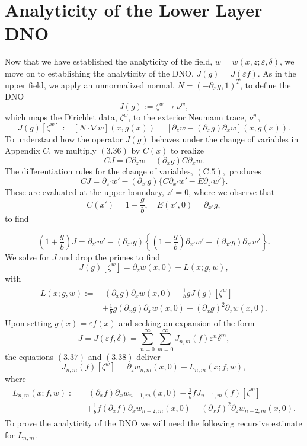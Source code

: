 \section{Analyticity of the Lower Layer DNO}
\label{intro:analyticity of lower dno}

Now that we have established the analyticity of the field, $w=w(x,z;\varepsilon,\delta)$, we move on to establishing the analyticity of the DNO, $J(g)=J(\varepsilon f)$. As in the upper field, we apply an unnormalized normal, $N=(-\partial_x g,1)^T$, to define the DNO
\begin{equation} J(g):= \zeta^w \to \nu^w,\end{equation}
which maps the Dirichlet data, $\zeta^w$, to the exterior Neumann trace, $\nu^w$,
\begin{equation}J(g)[\zeta^w]:= [N\cdot \nabla w](x,g(x)) = [\partial_z w - (\partial_x g) \partial_x w](x,g(x)).\end{equation}
To understand how the operator $J(g)$ behaves under the change of variables in Appendix $C$, we multiply $(3.36)$ by $C(x)$ to realize
$$CJ = C\partial_z w - (\partial_x g) C\partial_x w.$$
The differentiation rules for the change of variables, $(\text{C}.5),$ produces
$$CJ = \partial_{z'}w'-(\partial_{x'} g)\{C\partial_{x'} w' - E\partial_{z'} w'\}.$$
These are evaluated at the upper boundary, $z'=0$, where we observe that
$$C(x')=1+\frac{g}{b},\quad E(x',0)=\partial_{x'}g,$$
to find

$$\left(1+\frac{g}{b}\right)J=\partial_{z'}w' -(\partial_{x'} g)\left\{\left(1+\frac{g}{b}\right)\partial_{x'} w' - (\partial_{x'}g)\partial_{z'} w' \right\}.$$
We solve for $J$ and drop the primes to find
\begin{equation}J(g)[\zeta^w] = \partial_z w(x,0) - L(x;g,w),\end{equation}
with
\begin{align}
\begin{split}
L(x;g,w):= &~(\partial_xg)\partial_x w(x,0)-\frac{1}{b}gJ(g)[\zeta^w]\\&  + \frac{1}{b}g(\partial_x g)\partial_x w(x,0)  -(\partial_x g)^2\partial_z w(x,0). 
\end{split}
\end{align}
Upon setting $g(x)=\varepsilon f(x)$ and seeking an expansion of the form
$$J=J(\varepsilon f,\delta)=\sum_{n=0}^{\infty}\sum_{m=0}^{\infty}J_{n,m}(f)\varepsilon^n\delta^m,$$
the equations $(3.37)$ and $(3.38)$ deliver
\begin{equation}J_{n,m}(f)[\zeta^w]=\partial_z w_{n,m}(x,0)- L_{n,m}(x;f,w),\end{equation}
where
\begin{align}
\begin{split}
L_{n,m}(x;f,w):=&~ (\partial_xf)\partial_x w_{n-1,m}(x,0)-\frac{1}{b}fJ_{n-1,m}(f)[\zeta^w]\\&  + \frac{1}{b}f(\partial_x f)\partial_x w_{n-2,m}(x,0)  -(\partial_x f)^2\partial_z w_{n-2,m}(x,0). 
\end{split}
\end{align}
To prove the analyticity of the DNO we will need the following recursive estimate for $L_{n,m}$.
\vskip 0.1in

